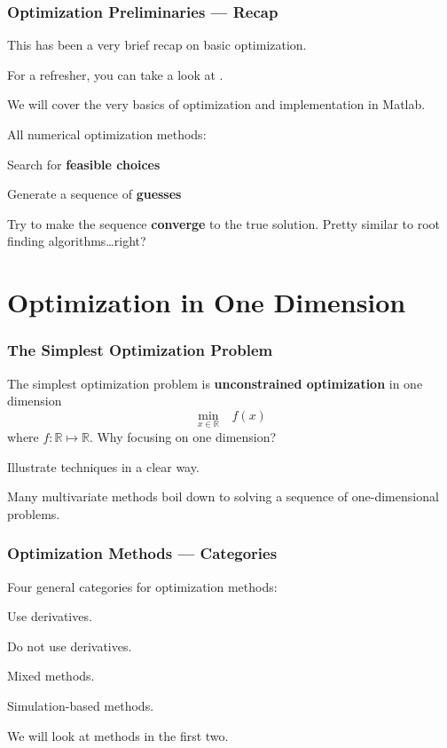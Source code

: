 \documentclass[11pt,xcolor={svgnames},aspectratio=169,usepdftitle=false]{beamer}
\let\toneitemize\itemize
\let\ttwoitemize\enditemize
\renewenvironment{itemize}{\toneitemize\addtolength{\itemsep}{0.7\baselineskip}}{\ttwoitemize}
\let\toneenumer\enumerate
\let\ttwoenumer\endenumerate
\renewenvironment{enumerate}{\toneenumer\addtolength{\itemsep}{0.7\baselineskip}}{\ttwoenumer}
\begin{document}
\begin{frame}
  \frametitle{Optimization Preliminaries --- Recap}
\begin{itemize}
  \item This has been a very brief recap on basic optimization.
  \item For a refresher, you can take a look at \citet[Chapters~17-19]{simon1994mathematics}.
  \item We will cover the very basics of optimization and implementation in Matlab.
  \item All numerical optimization methods:
  \begin{itemize}
    \item Search for \alert{\textbf{feasible choices}}
    \item Generate a sequence of \alert{\textbf{guesses}}
    \item Try to make the sequence \alert{\textbf{converge}} to the true solution.
  \end{itemize}
  {\tiny Pretty similar to root finding algorithms\ldots right?}
\end{itemize}
\end{frame}

\section{Optimization in One Dimension}

\begin{frame}
  \frametitle{The Simplest Optimization Problem}

The simplest optimization problem is \alert{\textbf{unconstrained optimization}} in one dimension
\[
\underset{x\in\mathbb{R}}{\min} \phantom{\Omega} f(x)
\]
where $f : \mathbb{R}\mapsto\mathbb{R}$.
Why focusing on one dimension?
\begin{enumerate}
  \item Illustrate techniques in a clear way.
  \item Many multivariate methods boil down to solving a sequence of one-dimensional problems.
\end{enumerate}
\end{frame}

\begin{frame}
  \frametitle{Optimization Methods --- Categories}
Four general categories for optimization methods:
\begin{enumerate}
  \item Use derivatives.
  \item Do not use derivatives.
  \item Mixed methods.
  \item Simulation-based methods.
\end{enumerate}

We will look at methods in the first two.
\end{frame}
\end{document}
